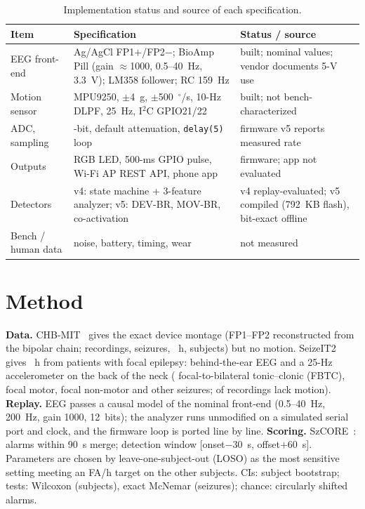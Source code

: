 \documentclass[conference,letterpaper]{IEEEtran}
\begin{document}
\begin{table}[t]
\centering
\caption{Implementation status and source of each specification.}
\label{tab:status}
\footnotesize
\setlength{\tabcolsep}{2pt}
\begin{tabular}{>{\raggedright\arraybackslash}p{}>{\raggedright\arraybackslash}p{}>{\raggedright\arraybackslash}p{}}
\toprule
Item & Specification & Status / source \\
\midrule
EEG front-end & Ag/AgCl FP1$+$/FP2$-$; BioAmp Pill (gain $\approx$1000, 0.5--40~Hz, 3.3~V); LM358 follower; RC 159~Hz & built; nominal values; vendor documents 5-V use~\cite{bioamp} \\
Motion sensor & MPU9250, $\pm$4~g, $\pm$500~$^\circ$/s, 10-Hz DLPF, 25~Hz, I$^2$C GPIO21/22~\cite{mpu9250} & built; not bench-characterized \\
ADC, sampling & 12-bit, default attenuation, \texttt{delay(5)} loop & firmware v5 reports measured rate \\
Outputs & RGB LED, 500-ms GPIO pulse, Wi-Fi AP REST API, phone app & firmware; app not evaluated \\
Detectors & v4: state machine + 3-feature analyzer; v5: DEV-BR, MOV-BR, co-activation & v4 replay-evaluated; v5 compiled (792~KB flash), bit-exact offline \\
Bench / human data & noise, battery, timing, wear & not measured \\
\bottomrule
\end{tabular}
\end{table}

\section{Method}\label{sec:method}
\textbf{Data.} CHB-MIT~\cite{shoeb2009thesis,goldberger2000physionet} gives the exact device montage (FP1--FP2 reconstructed from the bipolar chain; \NRec{} recordings, \NSz{} seizures, \NHours{}~h, \NSubj{} subjects) but no motion. SeizeIT2~\cite{bhagubai2025seizeit2} gives \SHours{}~h from \SNSubj{} patients with focal epilepsy: behind-the-ear EEG and a 25-Hz accelerometer on the back of the neck (\SNFBTC{} focal-to-bilateral tonic--clonic (FBTC), \SNMotor{} focal motor, \SNNonMotor{} focal non-motor and \SNOther{} other seizures; \SMovMissing{} of \SNRuns{} recordings lack motion).
\textbf{Replay.} EEG passes a causal model of the nominal front-end (0.5--40~Hz, 200~Hz, gain 1000, 12~bits); the analyzer runs unmodified on a simulated serial port and clock, and the firmware loop is ported line by line.
\textbf{Scoring.} SzCORE~\cite{dan2025szcore}: alarms within 90~s merge; detection window [onset$-$30~s, offset$+$60~s]. Parameters are chosen by leave-one-subject-out (LOSO) as the most sensitive setting meeting an FA/h target on the other subjects. CIs: subject bootstrap; tests: Wilcoxon (subjects), exact McNemar (seizures); chance: circularly shifted alarms.
\end{document}
